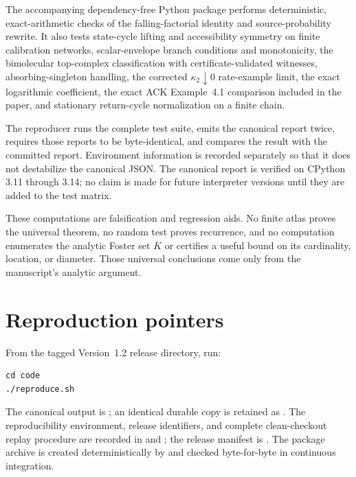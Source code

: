 \documentclass[10pt]{article}
\begin{document}
The accompanying dependency-free Python package performs deterministic,
exact-arithmetic checks of the falling-factorial identity and
source-probability rewrite.  It also tests state-cycle lifting and accessibility
symmetry on finite calibration networks, scalar-envelope branch conditions and
monotonicity, the bimolecular top-complex classification with
certificate-validated witnesses, absorbing-singleton handling, the corrected
$\kappa_2\downarrow0$ rate-example limit, the exact logarithmic coefficient,
the exact ACK Example~4.1 comparison included in the paper, and stationary
return-cycle normalization on a finite chain.

The reproducer runs the complete test suite, emits the canonical report twice,
requires those reports to be byte-identical, and compares the result with the
committed report.  Environment information is recorded separately so that it
does not destabilize the canonical JSON.  The canonical report is verified on
CPython 3.11 through 3.14; no claim is made for future interpreter versions
until they are added to the test matrix.

These computations are falsification and regression aids.  No finite atlas
proves the universal theorem, no random test proves recurrence, and no
computation enumerates the analytic Foster set $K$ or certifies a useful bound
on its cardinality, location, or diameter.  Those universal conclusions come
only from the manuscript's analytic argument.

\section{Reproduction pointers}

From the tagged Version~1.2 release directory, run:

\begin{verbatim}
cd code
./reproduce.sh
\end{verbatim}

The canonical output is
; an identical durable copy is retained
as .  The reproducibility environment,
release identifiers, and complete clean-checkout replay procedure are recorded
in  and ; the release manifest is
.  The package archive is created
deterministically by  and checked
byte-for-byte in continuous integration.
\end{document}
